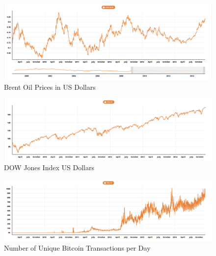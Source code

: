 \documentclass{article}[10 pt]
\newcommand{\vs}{\vspace{0.1in}}
\begin{document}
\vs

\begin{figure}[ht!]

\centering

\includegraphics[width=150mm]{brent_oil.png}

\caption{Brent Oil Prices in US Dollars}

\label{overflow}

\end{figure}

\vs

\begin{figure}[ht!]

\centering

\includegraphics[width=150mm]{dj_days.png}

\caption{DOW Jones Index US Dollars}

\label{overflow}

\end{figure}

\vs

\begin{figure}[ht!]

\centering

\includegraphics[width=150mm]{trans_day.png}

\caption{Number of Unique Bitcoin Transactions per Day}

\label{overflow}

\end{figure}
\end{document}
